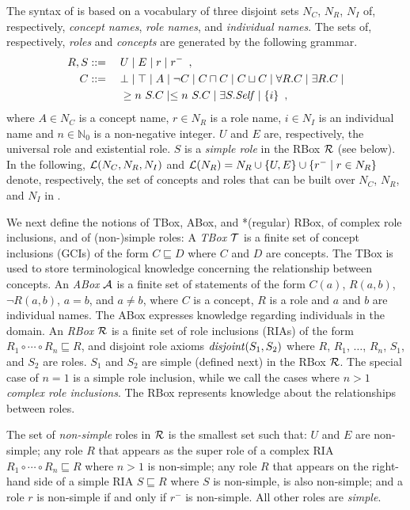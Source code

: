 \documentclass[
]{ceurart}
\begin{document}
The syntax of \SROIQ is based on a vocabulary of three disjoint sets $N_C$, $N_R$, $N_I$ of, respectively, \emph{concept names}, \emph{role names}, and \emph{individual names}. The sets of, respectively, \SROIQ  \emph{roles} and \SROIQ \emph{concepts} are generated by the following grammar.
{\footnotesize
\begin{alignat*}{2}
  R, S &::={} && U \mid E \mid r \mid r^{-} \enspace,\\
  C &::= && \bot \mid \top \mid A \mid \neg C \mid C \sqcap C \mid C \sqcup C \mid \forall R.C \mid \exists R.C \mid \\ 
  &&& \geq n~S.C \mid \leq n~S.C \mid \exists S.\mathit{Self} \mid \{i\} \enspace,
\end{alignat*}
}
where $A \in N_C$ is a concept name, $r \in N_R$ is a role name, $i \in N_I$ is an individual name and $n \in \mathbb{N}_0$ is a non-negative integer. 
%
$U$ and $E$ are, respectively, the universal role and existential role. $S$ is a \emph{simple role} in the RBox $\mathcal{R}$ (see below). In the following, $\mathcal{L}(N_C, N_R, N_I)$ and $\mathcal{L}(N_R) = N_R \cup \{U, E\} \cup \{r^- \mid r \in N_R\}$ denote, respectively, the set of concepts and roles that can be built over $N_C$, $N_R$, and $N_I$ in \SROIQ.

We next define the notions of TBox, ABox, and *(regular) RBox, of complex role inclusions, and of (non-)simple roles:
A \emph{TBox} $\mathcal{T}$ is a finite set of concept inclusions (GCIs) of the form $C \sqsubseteq D$ where $C$ and $D$ are concepts. The TBox is used to store terminological knowledge concerning the relationship between concepts. 
%
An \emph{ABox} $\mathcal{A}$ is a finite set of statements of the form $C(a)$, $R(a,b)$, $\lnot R (a,b)$, $a = b$, and $a \not= b$, where $C$ is a concept, $R$ is a role and $a$ and $b$ are individual names. The ABox expresses knowledge regarding individuals in the domain. 
%
An \emph{RBox} $\mathcal{R}$ is a finite set of role inclusions (RIAs) of the form $R_1 \circ \cdots \circ R_n \sqsubseteq R$, and disjoint role axioms $\mathit{disjoint}(S_1, S_2)$ where $R$, $R_1$, $\dots$, $R_n$, $S_1$, and $S_2$ are roles. $S_1$ and $S_2$ are simple (defined next) in the RBox $\mathcal{R}$. The special case of $n = 1$ is a simple role inclusion, while we call the cases where $n > 1$ \emph{complex role inclusions}. The RBox represents knowledge about the relationships between roles.

The set of \emph{non-simple} roles in $\mathcal{R}$ is the smallest set such that: $U$ and $E$ are non-simple; any role $R$ that appears as the super role of a complex RIA $R_1 \circ \cdots \circ R_n \sqsubseteq R$ where $n > 1$ is non-simple; any role $R$ that appears on the right-hand side of a simple RIA $S \sqsubseteq R$ where $S$ is non-simple, is also non-simple; and a role $r$ is non-simple if and only if $r^-$ is non-simple.
All other roles are \emph{simple}.
\end{document}
